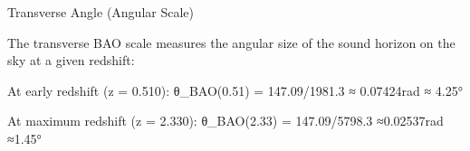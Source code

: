 Transverse Angle (Angular Scale)

The transverse BAO scale measures the angular size of the sound horizon on the sky at a given redshift:

At early redshift (z = 0.510):
θ_BAO(0.51) = 147.09/1981.3 ≈ 0.07424rad ≈ 4.25°

At maximum redshift (z = 2.330):
θ_BAO(2.33) = 147.09/5798.3 ≈0.02537rad ≈1.45°
